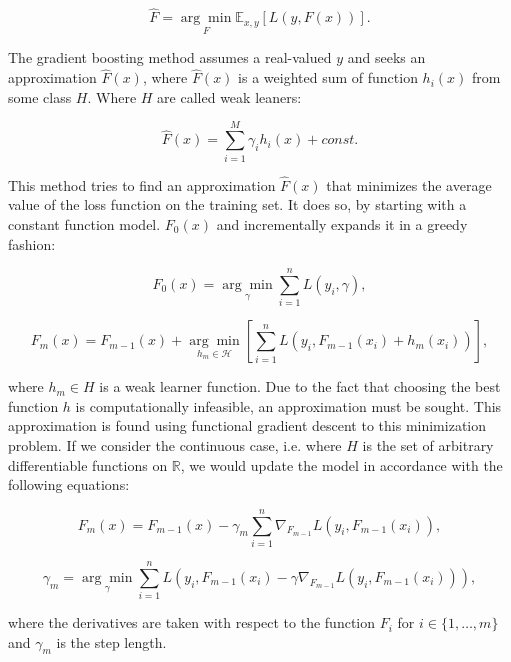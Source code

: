 \begin{equation}
\hat{F}=\underset{F}{\arg\min}\mathbb{E}_{x,y}[L(y,F(x))].
\end{equation}

The gradient boosting method assumes a real-valued $y$ and seeks an approximation $\hat{F}(x)$, where $\hat{F}(x)$ is a weighted sum of function $h_i(x)$ from some class $H$. Where $H$ are called weak leaners:

\begin{equation}
\hat{F}(x)=\sum_{i=1}^{M}\gamma_i h_i(x)+const.
\end{equation}

This method tries to find an approximation $\hat{F}(x)$ that minimizes the average value of the loss function on the training set. It does so, by starting with a constant function model. $F_0(x)$ and incrementally expands it in a greedy fashion:

\begin{equation}
F_0(x)=\underset{\gamma}{\arg\min}\sum_{i=1}^{n}L(y_i,\gamma),
\end{equation}

\begin{equation}
F_m(x)=F_{m-1}(x)+\underset{h_m\in\mathcal{H}}{\arg\min}\left[\sum_{i=1}^{n}L(y_i,F_{m-1}(x_i)+h_m(x_i))\right],
\end{equation}

\noindent where $h_m\in H$ is a weak learner function. Due to the fact that choosing the best function $h$ is computationally infeasible, an approximation must be sought. This approximation is found using functional gradient descent to this minimization problem. If we consider the continuous case, i.e. where $H$ is the set of arbitrary differentiable functions on $\mathbb{R}$, we would update the model in accordance with the following equations:

\begin{equation}
F_m(x)=F_{m-1}(x)-\gamma_m\sum_{i=1}^{n}\nabla_{F_{m-1}}L(y_i,F_{m-1}(x_i)),
\end{equation}

\begin{equation}
\gamma_m=\underset{\gamma}{\arg\min}\sum_{i=1}^{n}L(y_i,F_{m-1}(x_i)-\gamma\nabla_{F_{m-1}}L(y_i,F_{m-1}(x_i))),
\end{equation}

\noindent where the derivatives are taken with respect to the function $F_i$ for $i \in \{1,\ldots,m\}$ and $\gamma_m$ is the step length. 



